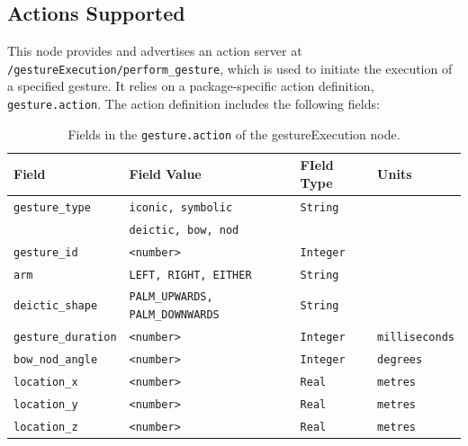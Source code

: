 \documentclass{CSSRforAfrica}
\begin{document}
\subsection*{Actions Supported}
This node provides and advertises an action server at \texttt{/gestureExecution/perform\_gesture}, which is used to initiate the execution of a specified gesture. It relies on a package-specific action definition, \texttt{gesture.action}. The action definition includes the following fields:

\begin{longtable}[c]{|l|p{3.5cm}|l|l|}
    \caption{Fields in the \texttt{gesture.action} of the gestureExecution node.} \label{tab:gesture.action_field} \\
    \hline
    \rowcolor{gray!30}
    \footnotesize{\textbf{Field}} & \footnotesize{\textbf{Field Value}} & \footnotesize{\textbf{FIeld Type}} & \footnotesize{\textbf{Units}}\\ \hline
    \endhead %
    
    \footnotesize{\texttt{gesture\_type}} & \footnotesize{\texttt{iconic, symbolic}} & \footnotesize{\texttt{String}} & \footnotesize{}  \\ 
   \footnotesize{} & \footnotesize{\texttt{deictic, bow, nod}} & \footnotesize{} & \footnotesize{}  \\\hline
\footnotesize{\texttt{gesture\_id}} & \footnotesize{\texttt{<number>}} & \footnotesize{\texttt{Integer}} & \footnotesize{}  \\ \hline
\footnotesize{\texttt{arm}} & \footnotesize{\texttt{LEFT, RIGHT, EITHER}} & \footnotesize{\texttt{String}} & \footnotesize{}  \\ \hline
\footnotesize{\texttt{deictic\_shape}} & \footnotesize{\texttt{PALM\_UPWARDS, PALM\_DOWNWARDS}} & \footnotesize{\texttt{String}} & \footnotesize{}  \\ \hline
\footnotesize{\texttt{gesture\_duration}} & \footnotesize{\texttt{<number>}} & \footnotesize{\texttt{Integer}} & \footnotesize{\texttt{milliseconds}}  \\ \hline
\footnotesize{\texttt{bow\_nod\_angle}} & \footnotesize{\texttt{<number>}} & \footnotesize{\texttt{Integer}} & \footnotesize{\texttt{degrees}}  \\ \hline
\footnotesize{\texttt{location\_x}} & \footnotesize{\texttt{<number>}} & \footnotesize{\texttt{Real}} & \footnotesize{\texttt{metres}}  \\ \hline
\footnotesize{\texttt{location\_y}} & \footnotesize{\texttt{<number>}} & \footnotesize{\texttt{Real}} & \footnotesize{\texttt{metres}}  \\ \hline
\footnotesize{\texttt{location\_z}} & \footnotesize{\texttt{<number>}} & \footnotesize{\texttt{Real}} & \footnotesize{\texttt{metres}}  \\ \hline
\end{longtable}
\end{document}
